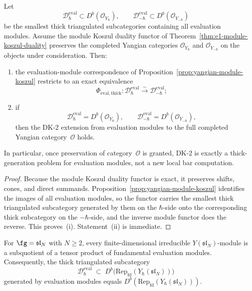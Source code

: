 \begin{proposition}
\label{prop:yangian-dk2-thick-generation}
Let
\[
\mathcal{D}_{\hbar}^{\mathrm{eval}}
\subset D^b(\mathcal{O}_{Y_\hbar}),
\qquad
\mathcal{D}_{-\hbar}^{\mathrm{eval}}
\subset D^b(\mathcal{O}_{Y_{-\hbar}})
\]
be the smallest thick triangulated subcategories containing all
evaluation modules.  Assume the module Koszul duality functor of
Theorem~\ref{thm:e1-module-koszul-duality} preserves the completed
Yangian categories $\mathcal{O}_{Y_\hbar}$ and
$\mathcal{O}_{Y_{-\hbar}}$ on the objects under consideration.  Then:
\begin{enumerate}[label=\textup{(\roman*)}]
\item the evaluation-module correspondence of
  Proposition~\ref{prop:yangian-module-koszul} restricts to an exact
  equivalence
  \[
  \Phi_{\mathrm{eval,thick}}\colon
  \mathcal{D}_{\hbar}^{\mathrm{eval}}
  \xrightarrow{\sim}
  \mathcal{D}_{-\hbar}^{\mathrm{eval}};
  \]
\item if
  \[
  \mathcal{D}_{\hbar}^{\mathrm{eval}}
  = D^b(\mathcal{O}_{Y_\hbar}),
  \qquad
  \mathcal{D}_{-\hbar}^{\mathrm{eval}}
  = D^b(\mathcal{O}_{Y_{-\hbar}}),
  \]
  then the DK-2 extension from evaluation modules to the full
  completed Yangian category~$\mathcal{O}$ holds.
\end{enumerate}
In particular, once preservation of category~$\mathcal{O}$ is granted,
DK-2 is exactly a thick-generation problem for evaluation modules, not
a new local bar computation.
\end{proposition}

\begin{proof}
Because the module Koszul duality functor is exact, it preserves
shifts, cones, and direct summands.  Proposition~\ref{prop:yangian-module-koszul}
identifies the images of all evaluation modules, so the functor carries
the smallest thick triangulated subcategory generated by them on the
$\hbar$-side onto the corresponding thick subcategory on the
$-\hbar$-side, and the inverse module functor does the reverse.  This
proves~\textup{(i)}.  Statement~\textup{(ii)} is immediate.
\end{proof}

\begin{proposition}
\label{prop:dk2-thick-generation-typeA}
For $\fg = \mathfrak{sl}_N$ with $N \ge 2$, every finite-dimensional
irreducible $Y(\mathfrak{sl}_N)$-module is a subquotient of a tensor
product of fundamental evaluation modules.  Consequently, the
thick triangulated subcategory
\[
\mathcal{D}_{\hbar}^{\mathrm{eval}}
\;\subset\;
D^b\bigl(\mathrm{Rep}_{\mathrm{fd}}(Y_\hbar(\mathfrak{sl}_N))\bigr)
\]
generated by evaluation modules equals
$D^b(\mathrm{Rep}_{\mathrm{fd}}(Y_\hbar(\mathfrak{sl}_N)))$.
\end{proposition}

